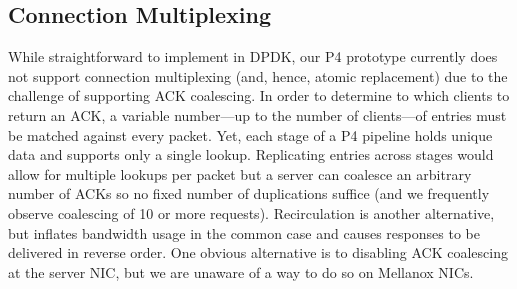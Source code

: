 
\subsection{Connection Multiplexing}

While straightforward to implement in DPDK, our P4 prototype currently
does not support connection multiplexing (and, hence, atomic
replacement) due to the challenge of supporting ACK coalescing.
In order to determine to which clients to return an ACK, a variable
number---up to the number of clients---of entries must be matched
against every packet.  Yet, each stage of a P4 pipeline holds unique
data and supports only a single lookup.
Replicating entries across stages would allow for multiple
lookups per packet but a server can coalesce
an arbitrary number of ACKs so no fixed number of
duplications suffice (and we frequently observe coalescing
of 10 or more requests).  Recirculation is another
alternative, but inflates bandwidth usage in the common case
and causes responses to be delivered in reverse order. 
One obvious alternative is to disabling ACK coalescing at the server NIC, but we are unaware
of a way to do so on Mellanox NICs.



